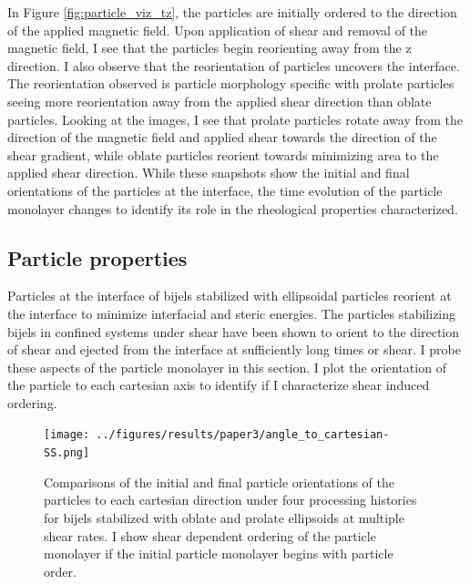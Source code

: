 In Figure \ref{fig:particle_viz_tz}, the particles are initially ordered to the direction of the applied magnetic field. Upon application of shear and removal
of the magnetic field, I see that the particles begin reorienting away from the z direction. I also observe that the reorientation of particles uncovers the interface.
The reorientation observed is particle morphology specific with prolate particles seeing more reorientation away from the applied shear direction than oblate particles.
Looking at the images, I see that prolate particles rotate away from the direction of the magnetic field and applied shear towards the direction of the shear gradient,
while oblate particles reorient towards minimizing area to the applied shear direction. While these snapshots show the initial and final orientations of the particles at the
interface, the time evolution of the particle monolayer changes to identify its role in the rheological properties characterized.

\subsection{Particle properties}

Particles at the interface of bijels stabilized with ellipsoidal particles reorient at the interface to minimize interfacial and
steric energies. \cite{gunther_timescales_2014} The particles stabilizing bijels in confined systems under shear have been shown to
orient to the direction of shear and ejected from the interface at sufficiently long times or shear.\cite{bonaccorso_shear_2020} 
I probe these aspects of the particle monolayer in this section. I plot the orientation of the particle to each cartesian axis 
to identify if I characterize shear induced ordering.

\begin{figure} 
    \centering 
    \texttt{[image: ../figures/results/paper3/angle\_to\_cartesian-SS.png]} 
    \caption{Comparisons of the initial and final particle orientations of the particles to each cartesian direction under
             four processing histories for bijels stabilized with oblate and prolate ellipsoids at multiple shear rates. I show
             shear dependent ordering of the particle monolayer if the initial particle monolayer begins with particle order.} 
    \label{fig:particle_orientation_cartesian_shear} 
\end{figure}

